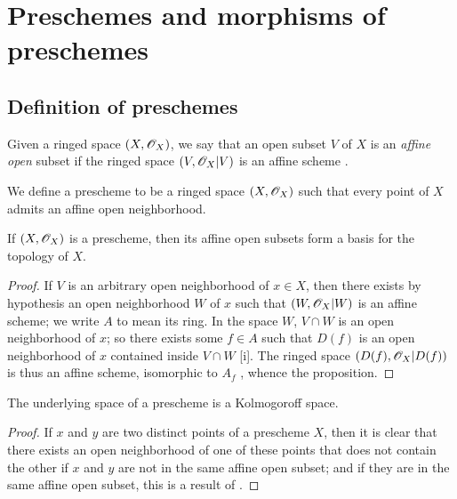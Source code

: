 \section{Preschemes and morphisms of preschemes}
\label{section:preschemes-and-morphisms}

\subsection{Definition of preschemes}
\label{subsection:preschemes-definition}

\begin{env}[2.1.1]
\label{1.2.1.1}
Given a ringed space $(X,\mathscr{O}_X)$, we say that an open subset $V$ of $X$ is an \emph{affine open} subset if the ringed space $(V,\mathscr{O}_X|V)$ is an affine scheme .
\end{env}

\begin{defn}[2.1.2]
\label{1.2.1.2}
We define a prescheme to be a ringed space $(X,\mathscr{O}_X)$ such that every point of $X$ admits an affine open neighborhood.
\end{defn}

\begin{prop}[2.1.3]
\label{1.2.1.3}
If $(X,\mathscr{O}_X)$ is a prescheme, then its affine open subsets form a basis for the topology of $X$.
\end{prop}

\begin{proof}
\label{proof-1.2.1.3}
If $V$ is an arbitrary open neighborhood of $x\in X$, then there exists by hypothesis an open neighborhood $W$ of $x$ such that $(W,\mathscr{O}_X|W)$ is an affine scheme;
we write $A$ to mean its ring.
In the space $W$, $V\cap W$ is an open neighborhood of $x$;
so there exists some $f\in A$ such that $D(f)$ is an open neighborhood of $x$ contained inside $V\cap W$ [i].
The ringed space $(D(f),\mathscr{O}_X|D(f))$ is thus an affine scheme, isomorphic to $A_f$ , whence the proposition.
\end{proof}

\begin{prop}[2.1.4]
\label{1.2.1.4}
The underlying space of a prescheme is a Kolmogoroff space.
\end{prop}

\begin{proof}
\label{proof-1.2.1.4}
If $x$ and $y$ are two distinct points of a prescheme $X$, then it is clear that there exists an open neighborhood of one of these points that does not contain the other if $x$ and $y$ are not in the same affine open subset; and if they are in the same affine open subset, this is a result of .
\end{proof}

